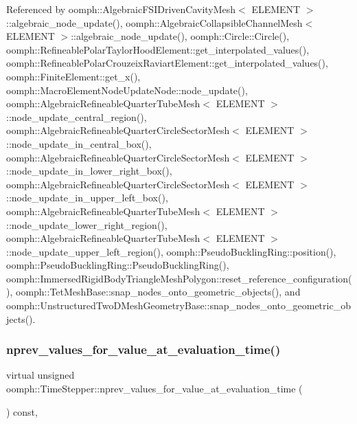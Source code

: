 Referenced by oomph\+::\+Algebraic\+F\+S\+I\+Driven\+Cavity\+Mesh$<$ E\+L\+E\+M\+E\+N\+T $>$\+::algebraic\+\_\+node\+\_\+update(), oomph\+::\+Algebraic\+Collapsible\+Channel\+Mesh$<$ E\+L\+E\+M\+E\+N\+T $>$\+::algebraic\+\_\+node\+\_\+update(), oomph\+::\+Circle\+::\+Circle(), oomph\+::\+Refineable\+Polar\+Taylor\+Hood\+Element\+::get\+\_\+interpolated\+\_\+values(), oomph\+::\+Refineable\+Polar\+Crouzeix\+Raviart\+Element\+::get\+\_\+interpolated\+\_\+values(), oomph\+::\+Finite\+Element\+::get\+\_\+x(), oomph\+::\+Macro\+Element\+Node\+Update\+Node\+::node\+\_\+update(), oomph\+::\+Algebraic\+Refineable\+Quarter\+Tube\+Mesh$<$ E\+L\+E\+M\+E\+N\+T $>$\+::node\+\_\+update\+\_\+central\+\_\+region(), oomph\+::\+Algebraic\+Refineable\+Quarter\+Circle\+Sector\+Mesh$<$ E\+L\+E\+M\+E\+N\+T $>$\+::node\+\_\+update\+\_\+in\+\_\+central\+\_\+box(), oomph\+::\+Algebraic\+Refineable\+Quarter\+Circle\+Sector\+Mesh$<$ E\+L\+E\+M\+E\+N\+T $>$\+::node\+\_\+update\+\_\+in\+\_\+lower\+\_\+right\+\_\+box(), oomph\+::\+Algebraic\+Refineable\+Quarter\+Circle\+Sector\+Mesh$<$ E\+L\+E\+M\+E\+N\+T $>$\+::node\+\_\+update\+\_\+in\+\_\+upper\+\_\+left\+\_\+box(), oomph\+::\+Algebraic\+Refineable\+Quarter\+Tube\+Mesh$<$ E\+L\+E\+M\+E\+N\+T $>$\+::node\+\_\+update\+\_\+lower\+\_\+right\+\_\+region(), oomph\+::\+Algebraic\+Refineable\+Quarter\+Tube\+Mesh$<$ E\+L\+E\+M\+E\+N\+T $>$\+::node\+\_\+update\+\_\+upper\+\_\+left\+\_\+region(), oomph\+::\+Pseudo\+Buckling\+Ring\+::position(), oomph\+::\+Pseudo\+Buckling\+Ring\+::\+Pseudo\+Buckling\+Ring(), oomph\+::\+Immersed\+Rigid\+Body\+Triangle\+Mesh\+Polygon\+::reset\+\_\+reference\+\_\+configuration(), oomph\+::\+Tet\+Mesh\+Base\+::snap\+\_\+nodes\+\_\+onto\+\_\+geometric\+\_\+objects(), and oomph\+::\+Unstructured\+Two\+D\+Mesh\+Geometry\+Base\+::snap\+\_\+nodes\+\_\+onto\+\_\+geometric\+\_\+objects().

\mbox{\label{classoomph_1_1TimeStepper_a5fcbef20161383c516ecdba4cf782106}} 
\subsubsection{\texorpdfstring{nprev\+\_\+values\+\_\+for\+\_\+value\+\_\+at\+\_\+evaluation\+\_\+time()}{nprev\_values\_for\_value\_at\_evaluation\_time()}}
{\footnotesize\ttfamily virtual unsigned oomph\+::\+Time\+Stepper\+::nprev\+\_\+values\+\_\+for\+\_\+value\+\_\+at\+\_\+evaluation\+\_\+time (\begin{DoxyParamCaption}{ }\end{DoxyParamCaption}) const\hspace{0.3cm}{\ttfamily [inline]}, {\ttfamily [virtual]}}



